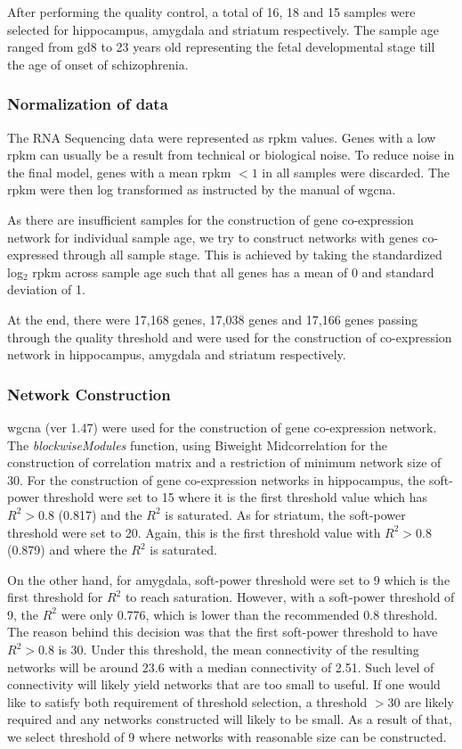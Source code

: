 \documentclass{book}
\begin{document}
	After performing the quality control, a total of 16, 18 and 15 samples were selected for hippocampus, amygdala and striatum respectively.
	The sample age ranged from \gls{gd}8 to 23 years old representing the fetal developmental stage till the age of onset of schizophrenia.
	
	\subsubsection{Normalization of data}
	The RNA Sequencing data were represented as \gls{rpkm} values. 
	Genes with a low \gls{rpkm} can usually be a result from technical or biological noise\citep{Hart2013}.
	To reduce noise in the final model, genes with a mean \gls{rpkm} $< 1$ in all samples were discarded. 
	The \gls{rpkm} were then log transformed as instructed by the manual of \gls{wgcna}\citep{Langfelder2008}.
	
	As there are insufficient samples for the construction of gene co-expression network for individual sample age, we try to construct networks with genes co-expressed through all sample stage. 
	This is achieved by taking the standardized log$_2$ \gls{rpkm} across sample age such that all genes has a mean of 0 and standard deviation of 1.
	
	At the end, there were 17,168 genes, 17,038 genes and 17,166 genes passing through the quality threshold and were used for the construction of co-expression network in hippocampus, amygdala and striatum respectively. 
	 
	\subsubsection{Network Construction}
	\gls{wgcna} (ver 1.47) were used for the construction of gene co-expression network\citep{Langfelder2008}. 
	The \emph{blockwiseModules} function, using Biweight Midcorrelation for the construction of correlation matrix and a restriction of minimum network size of 30. 
	For the construction of gene co-expression networks in hippocampus, the soft-power threshold were set to 15 where it is the first threshold value which has $R^2 > 0.8$ (0.817) and the $R^2$ is saturated\citep{Zhang2005}.%
	As for striatum, the soft-power threshold were set to 20. 
	Again, this is the first threshold value with $R^2 >0.8$ (0.879) and where the $R^2$ is saturated.
	
	On the other hand, for amygdala, soft-power threshold were set to 9 which is the first threshold for $R^2$ to reach saturation. 
	However, with a soft-power threshold of 9, the $R^2$ were only 0.776, which is lower than the recommended 0.8 threshold.
	The reason behind this decision was that the first soft-power threshold to have $R^2 > 0.8$ is 30.
	Under this threshold, the mean connectivity of the resulting networks will be around 23.6 with a median connectivity of 2.51.
	Such level of connectivity will likely yield networks that are too small to useful.
	If one would like to satisfy both requirement of threshold selection, a threshold $>30$ are likely required and any networks constructed will likely to be small.
	As a result of that, we select threshold of 9 where networks with reasonable size can be constructed.
	
\end{document}
